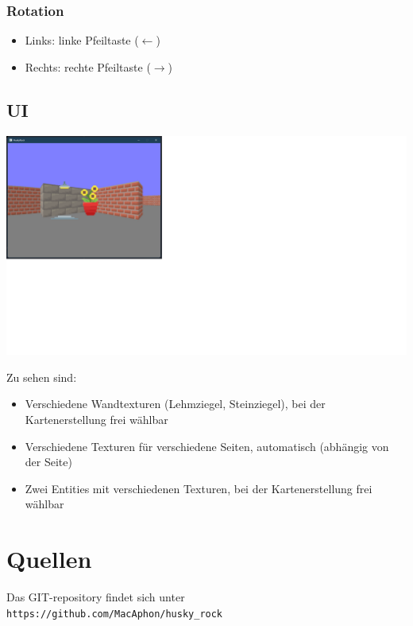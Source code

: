 \documentclass[a4paper,titlepage]{article}
\begin{document}
    \subsubsection*{Rotation}
    \begin{itemize}
        \item Links: linke Pfeiltaste ($\leftarrow$)
        \item Rechts: rechte Pfeiltaste ($\rightarrow$)
    \end{itemize}
    
    \subsection{UI}
    
    \includegraphics[scale=0.57]{demo_screenshot.png}
    
    Zu sehen sind:
    \begin{itemize}
        \item Verschiedene Wandtexturen (Lehmziegel, Steinziegel), bei der Kartenerstellung frei wählbar
        \item Verschiedene Texturen für verschiedene Seiten, automatisch (abhängig von der Seite)
        \item Zwei Entities mit verschiedenen Texturen, bei der Kartenerstellung frei wählbar
    \end{itemize}
    
    
    \newpage
    
    \section{Quellen}
    
    Das GIT-repository findet sich unter \\
    \verb|https://github.com/MacAphon/husky_rock|
    
\end{document}
